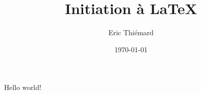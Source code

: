 \documentclass[a4paper,12pt,landscape]{article}
\title{\Huge Initiation à \LaTeX{}} %
\author{\Large Eric Thiémard} %
\date{\today} %
\begin{document}
\maketitle %
\thispagestyle{empty} %
\newpage %
Hello world! %
\end{document}
